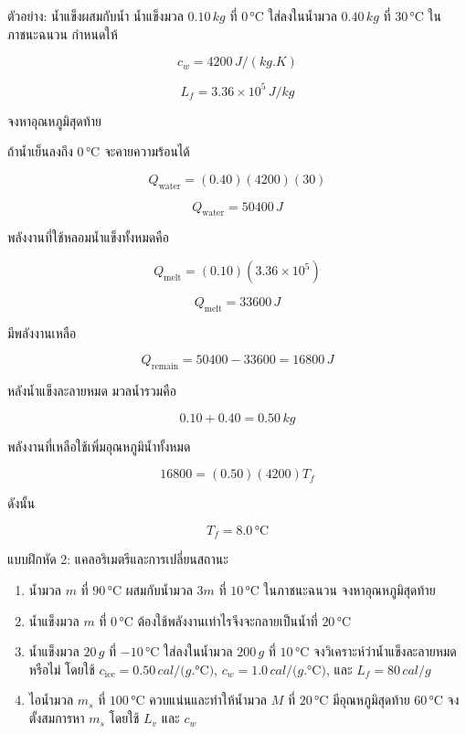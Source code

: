 \begin{examplebox}{ตัวอย่าง: น้ำแข็งผสมกับน้ำ}
น้ำแข็งมวล $0.10\,\si{kg}$ ที่ $0\,\si{\degreeCelsius}$ ใส่ลงในน้ำมวล $0.40\,\si{kg}$ ที่ $30\,\si{\degreeCelsius}$ ในภาชนะฉนวน กำหนดให้

\[
c_w=4200\,\si{J/(kg.K)}
\]

\[
L_f=3.36\times10^5\,\si{J/kg}
\]

จงหาอุณหภูมิสุดท้าย

ถ้าน้ำเย็นลงถึง $0\,\si{\degreeCelsius}$ จะคายความร้อนได้

\[
Q_{\text{water}}=(0.40)(4200)(30)
\]

\[
Q_{\text{water}}=50400\,\si{J}
\]

พลังงานที่ใช้หลอมน้ำแข็งทั้งหมดคือ

\[
Q_{\text{melt}}=(0.10)(3.36\times10^5)
\]

\[
Q_{\text{melt}}=33600\,\si{J}
\]

มีพลังงานเหลือ

\[
Q_{\text{remain}}=50400-33600=16800\,\si{J}
\]

หลังน้ำแข็งละลายหมด มวลน้ำรวมคือ

\[
0.10+0.40=0.50\,\si{kg}
\]

พลังงานที่เหลือใช้เพิ่มอุณหภูมิน้ำทั้งหมด

\[
16800=(0.50)(4200)T_f
\]

ดังนั้น

\[
\boxed{T_f=8.0\,\si{\degreeCelsius}}
\]
\end{examplebox}

\begin{exercisebox}{แบบฝึกหัด 2: แคลอริเมตรีและการเปลี่ยนสถานะ}
\begin{enumerate}
    \item น้ำมวล $m$ ที่ $90\,\si{\degreeCelsius}$ ผสมกับน้ำมวล $3m$ ที่ $10\,\si{\degreeCelsius}$ ในภาชนะฉนวน จงหาอุณหภูมิสุดท้าย
    \item น้ำแข็งมวล $m$ ที่ $0\,\si{\degreeCelsius}$ ต้องใช้พลังงานเท่าไรจึงจะกลายเป็นน้ำที่ $20\,\si{\degreeCelsius}$
    \item น้ำแข็งมวล $20\,\si{g}$ ที่ $-10\,\si{\degreeCelsius}$ ใส่ลงในน้ำมวล $200\,\si{g}$ ที่ $10\,\si{\degreeCelsius}$ จงวิเคราะห์ว่าน้ำแข็งละลายหมดหรือไม่ โดยใช้ $c_{\text{ice}}=0.50\,\si{cal/(g.\degreeCelsius)}$, $c_w=1.0\,\si{cal/(g.\degreeCelsius)}$, และ $L_f=80\,\si{cal/g}$
    \item ไอน้ำมวล $m_s$ ที่ $100\,\si{\degreeCelsius}$ ควบแน่นและทำให้น้ำมวล $M$ ที่ $20\,\si{\degreeCelsius}$ มีอุณหภูมิสุดท้าย $60\,\si{\degreeCelsius}$ จงตั้งสมการหา $m_s$ โดยใช้ $L_v$ และ $c_w$
\end{enumerate}
\end{exercisebox}

